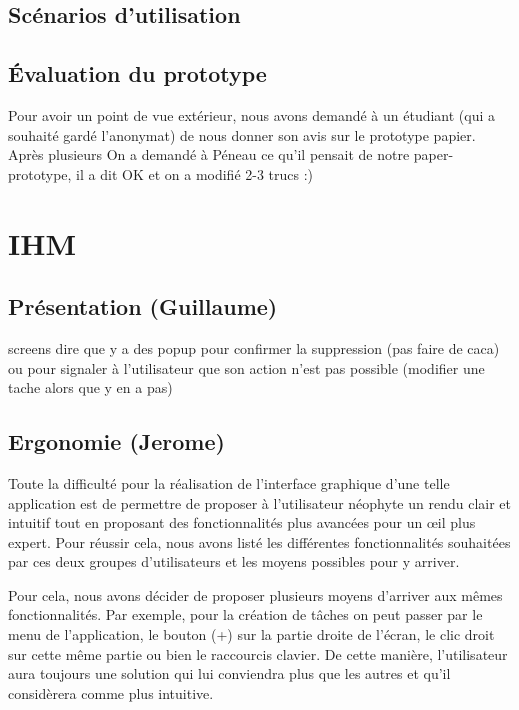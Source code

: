 	
	

	\section{Scénarios d'utilisation}
	
	
	
	\section{Évaluation du prototype}
		Pour avoir un point de vue extérieur, nous avons demandé à un étudiant (qui a souhaité gardé l'anonymat) de nous donner son avis sur le prototype papier. Après plusieurs 
		On a demandé à Péneau ce qu'il pensait de notre paper-prototype, il a dit OK et on a modifié 2-3 trucs :)
		


\chapter{IHM}
	
	\section{Présentation (Guillaume)}
		screens
		dire que y a des popup pour confirmer la suppression (pas faire de caca) ou pour signaler à l'utilisateur que son action n'est pas possible (modifier une tache alors que y en a pas)
	
	\section{Ergonomie (Jerome)}
		Toute la difficulté pour la réalisation de l'interface graphique d'une telle application est de permettre de proposer à l'utilisateur néophyte un rendu clair et intuitif tout en proposant des fonctionnalités plus avancées pour un {\oe}il plus expert. Pour réussir cela, nous avons listé les différentes fonctionnalités souhaitées par ces deux groupes d'utilisateurs et les moyens possibles pour y arriver.
		
		Pour cela, nous avons décider de proposer plusieurs moyens d'arriver aux mêmes fonctionnalités. Par exemple, pour la création de tâches on peut passer par le menu de l'application, le bouton (+) sur la partie droite de l'écran, le clic droit sur cette même partie ou bien le raccourcis clavier. De cette manière, l'utilisateur aura toujours une solution qui lui conviendra plus que les autres et qu'il considèrera comme plus intuitive.
		

